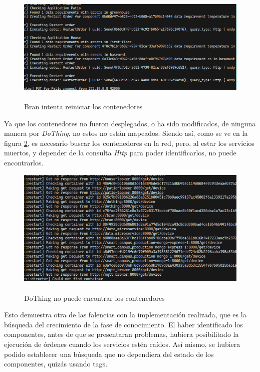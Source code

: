 \begin{figure}[ht]
    \centering
    \caption{\\Bran intenta reiniciar los contenedores}
    \label{fig:FindAny}
    \includegraphics[width=0.9\linewidth]{images/BranOrdersRestarts.png}
    \vspace{-4mm}
\end{figure}

\newpage

Ya que los contenedores no fueron desplegados, o ha sido modificados, de ninguna manera por \textit{DoThing}, no estos no están mapeados. Siendo así, como se ve en la figura \ref{fig:CantFindAny}, es necesario buscar los contenedores en la red, pero, al estar los servicios muertos, y depender de la consulta \textit{Http} para poder identificarlos, no puede encontrarlos.


\begin{figure}[ht]
    \centering
    \caption{\\DoThing no puede encontrar los contenedores}
    \label{fig:CantFindAny}
    \includegraphics[width=0.9\linewidth]{images/CantFind.png}
    \vspace{-4mm}
\end{figure}

Esto demuestra otra de las falencias con la implementación realizada, que es la búsqueda del crecimiento de la fase de conocimiento. El haber identificado los componentes, antes de que se presentaran problemas, hubiera posibilitado la ejecución de órdenes cuando los servicios estén caídos. Así mismo, se hubiera podido establecer una búsqueda que no dependiera del estado de los componentes, quizás usando tags.

